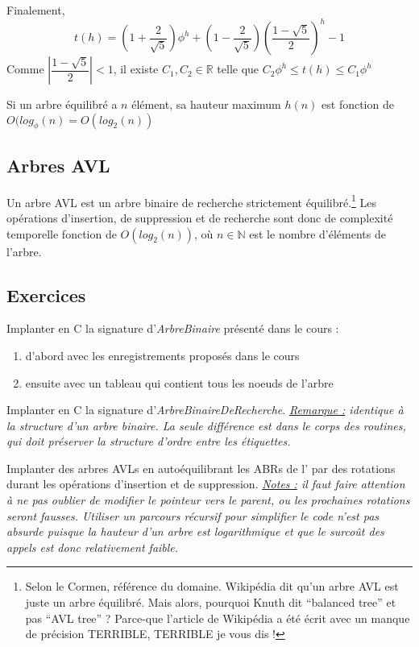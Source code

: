 \documentclass[../../../main.tex]{subfiles}
\begin{document}
Finalement,
$$t(h) = (1 + \frac{2}{\sqrt{5}})\phi^h + (1 - \frac{2}{\sqrt{5}})\left(\dfrac{1 - \sqrt{5}}{2}\right)^h - 1$$
Comme $\left|\dfrac{1 - \sqrt{5}}{2}\right| < 1$, il existe $C_1, C_2\in\mathbb{R}$ telle que $C_2\phi^h \leq t(h)\leq C_1\phi^h$

Si un arbre équilibré a $n$ élément, sa hauteur maximum $h(n)$ est fonction de $O(log_\phi(n) = O(log_2(n))$
\subsection{Arbres AVL}
\label{sub:arbres_avl}
 {
	Un arbre AVL est un arbre binaire de recherche strictement équilibré.\footnote{Selon le Cormen, référence du domaine. Wikipédia dit qu'un arbre AVL est juste un arbre équilibré. Mais alors, pourquoi Knuth dit ``balanced tree'' et pas ``AVL tree'' ? Parce-que l'article de Wikipédia a été écrit avec un manque de précision TERRIBLE, TERRIBLE je vous dis !}
}
Les opérations d'insertion, de suppression et de recherche sont donc de complexité temporelle fonction de $O(log_2(n))$, où $n\in\mathbb{N}$ est le nombre d'éléments de l'arbre.
\subsection{Exercices}
 Implanter en C la signature d'\textit{ArbreBinaire} présenté dans le cours :
\begin{enumerate}
	\item d'abord avec les enregistrements proposés dans le cours
	\item ensuite avec un tableau qui contient tous les noeuds de l'arbre
\end{enumerate}

 Implanter en C la signature d'\textit{ArbreBinaireDeRecherche}.\newline
\textit{\underline{Remarque :} identique à la structure d'un arbre binaire. La seule différence est dans le corps des routines, qui doit préserver la structure d'ordre entre les étiquettes.}

 \newline
Implanter des arbres AVLs en autoéquilibrant les ABRs de l' par des rotations durant les opérations d'insertion et de suppression. \newline
\textit{\underline{Notes :} il faut faire attention à ne pas oublier de modifier le pointeur vers le parent, ou les prochaines rotations seront fausses. Utiliser un parcours récursif pour simplifier le code n'est pas absurde puisque la hauteur d'un arbre est logarithmique et que le surcoût des appels est donc relativement faible.}




\end{document}
